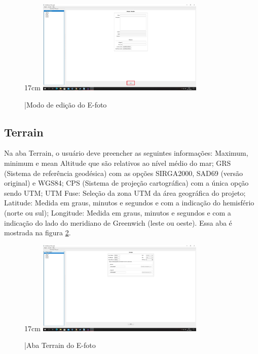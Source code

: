 \begin{figure}[!ht]{17cm}
	\includegraphics[width=8cm, center]{figuras/efoto2.jpg}
	\caption{|Modo de edição do E-foto} \label{fig:efoto2}
\end{figure}

\subsection{Terrain}
Na aba Terrain, o usuário deve preencher as seguintes informações: Maximum, minimum e mean Altitude que são relativos ao nível médio do mar; GRS (Sistema de referência geodésica) com as opções SIRGA2000, SAD69 (versão original) e WGS84; CPS (Sistema de projeção cartográfica) com a única opção sendo UTM; UTM Fuse: Seleção da zona UTM da área geográfica do projeto; Latitude: Medida em graus, minutos e segundos e com a indicação do hemisfério (norte ou sul); Longitude: Medida em graus, minutos e segundos e com a indicação do lado do meridiano de Greenwich (leste ou oeste). Essa aba é mostrada na figura \ref{fig:terrain}.

\begin{figure}[!ht]{17cm}
	\includegraphics[width=8cm, center]{figuras/terrain.jpg}
	\caption{|Aba Terrain do E-foto} \label{fig:terrain}
\end{figure}

